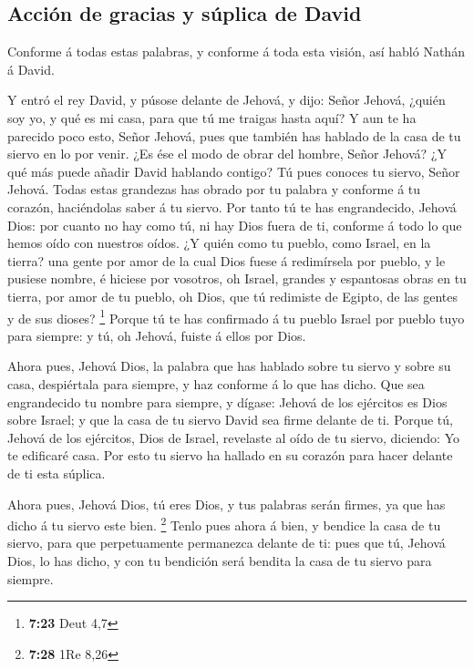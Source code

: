 \hypertarget{acciuxf3n-de-gracias-y-suxfaplica-de-david}{%
\subsection{Acción de gracias y súplica de
David}\label{acciuxf3n-de-gracias-y-suxfaplica-de-david}}

 Conforme á todas estas palabras, y conforme á toda esta
visión, así habló Nathán á David.

 Y entró el rey David, y púsose delante de Jehová, y dijo:
Señor Jehová, ¿quién soy yo, y qué es mi casa, para que tú me traigas
hasta aquí?  Y aun te ha parecido poco esto, Señor Jehová,
pues que también has hablado de la casa de tu siervo en lo por venir.
¿Es ése el modo de obrar del hombre, Señor Jehová?  ¿Y qué
más puede añadir David hablando contigo? Tú pues conoces tu siervo,
Señor Jehová.  Todas estas grandezas has obrado por tu
palabra y conforme á tu corazón, haciéndolas saber á tu siervo.
 Por tanto tú te has engrandecido, Jehová Dios: por cuanto
no hay como tú, ni hay Dios fuera de ti, conforme á todo lo que hemos
oído con nuestros oídos.  ¿Y quién como tu pueblo, como
Israel, en la tierra? una gente por amor de la cual Dios fuese á
redimírsela por pueblo, y le pusiese nombre, é hiciese por vosotros, oh
Israel, grandes y espantosas obras en tu tierra, por amor de tu pueblo,
oh Dios, que tú redimiste de Egipto, de las gentes y de sus dioses?
\footnote{\textbf{7:23} Deut 4,7}  Porque tú te has
confirmado á tu pueblo Israel por pueblo tuyo para siempre: y tú, oh
Jehová, fuiste á ellos por Dios.

 Ahora pues, Jehová Dios, la palabra que has hablado sobre
tu siervo y sobre su casa, despiértala para siempre, y haz conforme á lo
que has dicho.  Que sea engrandecido tu nombre para
siempre, y dígase: Jehová de los ejércitos es Dios sobre Israel; y que
la casa de tu siervo David sea firme delante de ti.  Porque
tú, Jehová de los ejércitos, Dios de Israel, revelaste al oído de tu
siervo, diciendo: Yo te edificaré casa. Por esto tu siervo ha hallado en
su corazón para hacer delante de ti esta súplica.

 Ahora pues, Jehová Dios, tú eres Dios, y tus palabras
serán firmes, ya que has dicho á tu siervo este bien. \footnote{\textbf{7:28}
  1Re 8,26}  Tenlo pues ahora á bien, y bendice la casa de
tu siervo, para que perpetuamente permanezca delante de ti: pues que tú,
Jehová Dios, lo has dicho, y con tu bendición será bendita la casa de tu
siervo para siempre.


